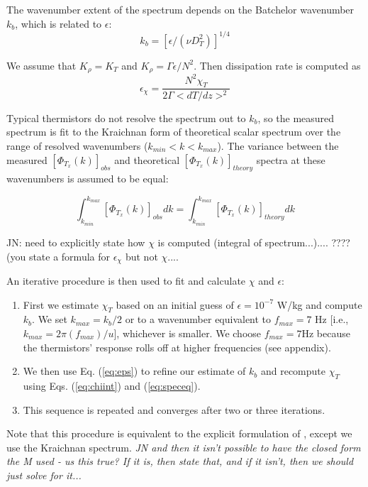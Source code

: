 \documentclass{ametsoc}
\begin{document}
The wavenumber extent of the spectrum depends on the Batchelor wavenumber $k_b$, which is related to $\epsilon$:
\begin{equation}
k_b=[\epsilon/(\nu D_{T}^{2})]^{1/4}
\label{eq:3}
\end{equation}

We assume that $K_\rho=K_T$ and $K_{\rho}=\Gamma \epsilon /N^2$. Then dissipation rate is computed as
\begin{equation}
\label{eq:eps}
\epsilon_{\chi}=\frac{N^2\chi_T}{2\Gamma <dT/dz>^2}
\end{equation}

Typical thermistors do not resolve the spectrum out to $k_b$, so the measured spectrum is fit to the Kraichnan form of theoretical scalar spectrum over the range of resolved wavenumbers ($k_{min}<k<k_{max}$). The variance between the measured $[\Phi_{T_x}(k)]_{obs}$ and theoretical $[\Phi_{T_x}(k)]_{theory}$ spectra at these  wavenumbers is assumed to be equal:

\begin{equation}
\label{eq:speceq}
\int^{k_{max}}_{k_{min}}[\Phi_{T_x}(k)]_{obs}dk
=\int^{k_{max}}_{k_{min}}[\Phi_{T_x}(k)]_{theory}dk
\label{eq:4}
\end{equation}

JN: need to explicitly state how $\chi$ is computed (integral of spectrum...).... ???? (you state a formula for $\epsilon_\chi$ but not $\chi$....

An iterative procedure is then used to fit and calculate $\chi$ and $\epsilon$:
\begin{enumerate}
\item First we estimate $\chi_T$ based on an initial guess of $\epsilon=10^{-7}$ W/kg and compute $k_b$. We set $k_{max} = k_b/2$ or to a wavenumber equivalent to $f_{max}=7$ Hz [i.e., $k_{max}= 2\pi(f_{max})/u$], whichever is smaller. We choose $f_{max}=7$Hz because the thermistors' response rolls off at higher frequencies (see appendix). 
\item We then use Eq. (\ref{eq:eps}) to refine our estimate of $k_b$ and recompute $\chi_T$ using Eqs. (\ref{eq:chiint}) and (\ref{eq:speceq}). 
\item This sequence is repeated and converges after two or three iterations.
\end{enumerate}
Note that this procedure is equivalent to the explicit formulation of \citep{alfordpinkel00b}, except we use the Kraichnan spectrum. {\em JN and then it isn't possible to have the closed form the M used - us this true?  If it is, then state that, and if it isn't, then we should just solve for it...}
\end{document}
